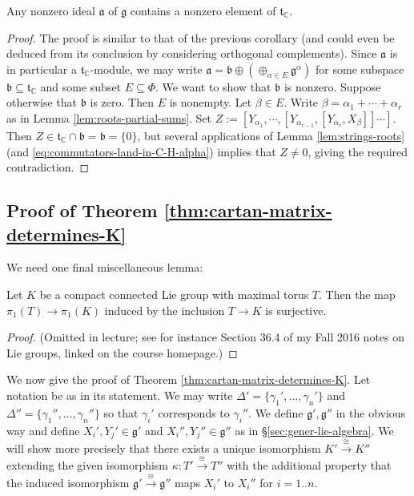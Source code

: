 \documentclass[reqno]{amsart} 
\begin{document}
\begin{corollary}\label{cor:nonzero-ideals-detected-via-t}
  Any nonzero ideal $\mathfrak{a}$ of $\mathfrak{g}$ contains a nonzero element of $\mathfrak{t}_{\mathbb{C}}$.
\end{corollary}
\begin{proof}
  The proof is similar to that of the previous corollary (and could even be deduced from its conclusion by considering orthogonal complements).  Since $\mathfrak{a}$ is in particular a $\mathfrak{t}_{\mathbb{C}}$-module, we may write $\mathfrak{a} = \mathfrak{b} \oplus (\oplus_{\alpha \in E} \mathfrak{g}^{\alpha})$ for some subspace $\mathfrak{b} \subseteq \mathfrak{t}_{\mathbb{C}}$ and some subset $E \subseteq \Phi$.  We want to show that $\mathfrak{b}$ is nonzero.  Suppose otherwise that $\mathfrak{b}$ is zero.  Then $E$ is nonempty.  Let $\beta \in E$.  Write $\beta = \alpha_1 + \dotsb + \alpha_r$ as in Lemma \ref{lem:roots-partial-sums}.  Set $Z := [Y_{\alpha_1}, \dotsb, [Y_{\alpha_{r-1}}, [Y_{\alpha_r}, X_{\beta}]] \dotsb ]$.  Then $Z \in \mathfrak{t}_{\mathbb{C}} \cap \mathfrak{b} = \mathfrak{b} = \{0\}$, but several applications of Lemma \ref{lem:strings-roots} (and \eqref{eq:commutators-land-in-C-H-alpha}) implies that $Z \neq 0$, giving the required contradiction.
\end{proof}

\subsection{Proof of Theorem \ref{thm:cartan-matrix-determines-K}}\label{sec:cnh2vo0fl3}
We need one final miscellaneous lemma:
\begin{lemma}\label{lem:pi-1-T-onto-pi-1-K}
  Let $K$ be a compact connected Lie group with maximal torus $T$.  Then the map $\pi_1(T) \rightarrow \pi_1(K)$ induced by the inclusion $T \rightarrow K$ is surjective.
\end{lemma}
\begin{proof}
  (Omitted in lecture; see for instance Section 36.4 of my Fall 2016 notes on Lie groups, linked on the course homepage.)
\end{proof}

We now give the proof of Theorem \ref{thm:cartan-matrix-determines-K}.  Let notation be as in its statement.  We may write $\Delta ' = \{\gamma_1 ', \dotsc, \gamma_n' \}$ and $\Delta '' = \{\gamma_1'', \dotsc, \gamma_n''\}$ so that $\gamma_i'$ corresponds to $\gamma_i''$.  We define $\mathfrak{g} ', \mathfrak{g} ''$ in the obvious way and define $X_i', Y_j' \in \mathfrak{g} '$ and $X_i'', Y_j'' \in \mathfrak{g} ''$ as in \S\ref{sec:gener-lie-algebra}.  We will show more precisely that there exists a unique isomorphism $K' \xrightarrow{\cong } K''$ extending the given isomorphism $\kappa : T' \xrightarrow{\cong } T''$ with the additional property that the induced isomorphism $\mathfrak{g} ' \xrightarrow{\cong } \mathfrak{g} ''$ maps $X_i'$ to $X_i''$ for $i=1..n$.
\end{document}
